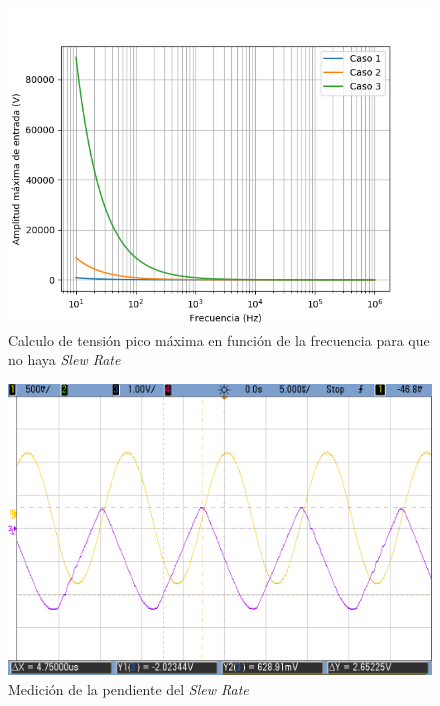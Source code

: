 \begin{figure}[H]
\begin{centering}
\includegraphics[scale=0.5]{../Ex1/iA/Resources1a/SlewRate123}
\par\end{centering}
\caption{Calculo de tensión pico máxima en función de la frecuencia para que
no haya \emph{Slew Rate}}
\label{1_a_18}

\end{figure}

\begin{figure}[H]
\begin{centering}
\includegraphics[scale=0.3]{../Ex1/iA/Resources1a/slewRatemed}
\par\end{centering}
\caption{Medición de la pendiente del \emph{Slew Rate}}
\label{1_a_13}

\end{figure}

